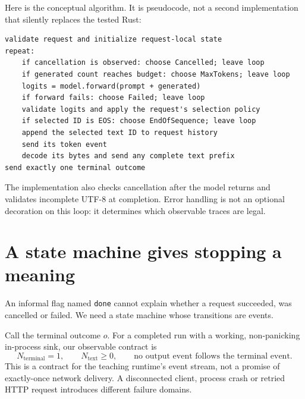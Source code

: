 Here is the conceptual algorithm. It is pseudocode, not a second implementation
that silently replaces the tested Rust:
\begin{verbatim}
validate request and initialize request-local state
repeat:
    if cancellation is observed: choose Cancelled; leave loop
    if generated count reaches budget: choose MaxTokens; leave loop
    logits = model.forward(prompt + generated)
    if forward fails: choose Failed; leave loop
    validate logits and apply the request's selection policy
    if selected ID is EOS: choose EndOfSequence; leave loop
    append the selected text ID to request history
    send its token event
    decode its bytes and send any complete text prefix
send exactly one terminal outcome
\end{verbatim}
The implementation also checks cancellation after the model returns and
validates incomplete UTF-8 at completion. Error handling is not an optional
decoration on this loop: it determines which observable traces are legal.

\section{A state machine gives stopping a meaning}
An informal flag named \texttt{done} cannot explain whether a request succeeded,
was cancelled or failed. We need a state machine whose transitions are events.


Call the terminal outcome $o$. For a completed run with a working, non-panicking
in-process sink, our observable contract is
\begin{equation}
N_{\mathrm{terminal}}=1,\qquad
N_{\mathrm{text}}\geq 0,\qquad
\text{no output event follows the terminal event}.
\label{eq:terminal-contract}
\end{equation}
This is a contract for the teaching runtime's event stream, not a promise of
exactly-once network delivery. A disconnected client, process crash or retried
HTTP request introduces different failure domains.

